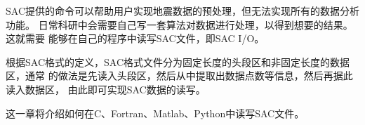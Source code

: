 SAC提供的命令可以帮助用户实现地震数据的预处理，但无法实现所有的数据分析功能。
日常科研中会需要自己写一套算法对数据进行处理，以得到想要的结果。这就需要
能够在自己的程序中读写SAC文件，即SAC I/O。

根据SAC格式的定义，SAC格式文件分为固定长度的头段区和非固定长度的数据区，通常
的做法是先读入头段区，然后从中提取出数据点数等信息，然后再据此读入数据区，
由此即可实现SAC数据的读写。

这一章将介绍如何在C、Fortran、Matlab、Python中读写SAC文件。

